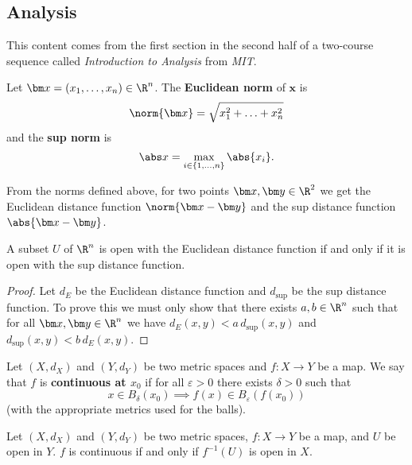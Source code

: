 \subsection{Analysis}

This content comes from the first section in the second half of a two-course 
sequence called \emph{Introduction to Analysis} from \emph{MIT}.

\begin{definition}[]
	Let $\bm x = (x_1, \ldots, x_n) \in \R^n$.
	The \textbf{Euclidean norm} of $\bm x$ is
	\[
		\norm{\bm x} = \sqrt{x_1^2 + \ldots + x_n^2}
	\]
	and the \textbf{sup norm} is
	\[
		\abs x = \max_{i \in \{1,\ldots,n\}} \abs{x_i}.
	\]
\end{definition}

\begin{remark}
	From the norms defined above, for two points $\bm x, \bm y \in \R^2$ we get
	the Euclidean distance function $\norm{\bm x - \bm y}$
	and the sup distance function $\abs{\bm x - \bm y}$.
\end{remark}

\begin{proposition}[]
	A subset $U$ of $\R^n$ is open with the Euclidean distance function
	if and only if it is open with the sup distance function.
\end{proposition}

\begin{proof}
	Let $d_E$ be the Euclidean distance function and $d_{\sup}$ be the
	sup distance function.
	To prove this we must only show that there exists $a, b \in \R^n$
	such that for all $\bm x, \bm y \in \R^n$ we have $
		d_E(x,y) < a \, d_{\sup}(x,y)
	$ and $
		d_{\sup}(x,y) < b \, d_E(x,y)
	$.
\end{proof}

\begin{definition}[Continuity]
	Let $(X, d_X)$ and $(Y, d_Y)$ be two metric spaces
	and $f: X \to Y$ be a map.
	We say that $f$ is \textbf{continuous at $x_0$}
	if for all $\varepsilon > 0$ there exists $\delta > 0$ such that
	\[
		x \in B_{\delta}(x_0) 
		\implies f(x) \in B_{\varepsilon} \left(f(x_0)\right)
	\]
	(with the appropriate metrics used for the balls).
\end{definition}

\begin{theorem}[]
	Let $(X, d_X)$ and $(Y, d_Y)$ be two metric spaces,
	$f: X \to Y$ be a map,
	and $U$ be open in $Y$.
	$f$ is continuous if and only if $f^{-1}(U)$ is open in $X$.
\end{theorem}

